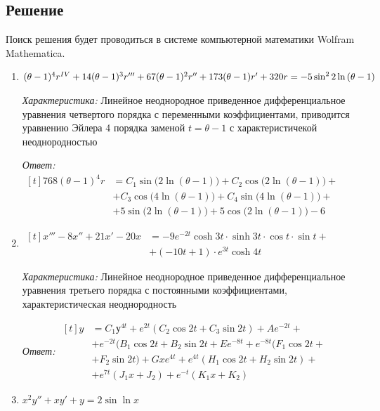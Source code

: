 \documentclass[a4paper, 14pt, fleqn]{extarticle}
\begin{document}
		\subsection{Решение}
			\noindent Поиск решения будет проводиться в системе компьютерной математики Wolfram Mathematica.
			\begin{enumerate}
				\item  \((\theta - 1)^4r^{\MakeUppercase{\romannumeral 4}} + 14(\theta - 1)^3r''' + 67(\theta - 1)^2r'' + 173(\theta - 1)r' + 320r = -5\sin^2{2\ln{(\theta - 1)}} \)

					\textit{Характеристика:} Линейное неоднородное приведенное дифференциальное уравнения четвертого порядка с переменными коэффициентами, приводится
										уравнению Эйлера 4 порядка заменой \( t = \theta -1 \) с характеристичекой неоднородностью
		
					\textit{Ответ:} \( \begin{aligned}[t] 768(\theta - 1)^4r &= C_1\sin\big(2\ln{(\theta - 1)}\big) + C_2\cos\big(2\ln{(\theta - 1)}\big) + \\&+ C_3\cos\big(4\ln{(\theta - 1)\big)} + C_4\sin{\big(4\ln{(\theta - 1)\big)}} +\\&+ 5\sin{\big(2\ln{(\theta - 1)}\big)} + 5\cos{\big(2\ln{(\theta - 1)}\big)} - 6   \end{aligned}\)

				\item \( \begin{aligned}[t] x''' - 8x'' + 21x' -20x &= -9e^{-2t}\cosh{3t}\cdot \sinh{3t} \cdot \cos{t} \cdot \sin{t} + \\ &+ (-10t+1)\cdot e^{3t}\cosh{4t} \end{aligned} \)

					\textit{Характеристика:} Линейное неоднородное приведенное дифференциальное уравнения третьего порядка с постоянными коэффициентами, характеристическая неоднородность
		
					\textit{Ответ:} \(\begin{aligned}[t] y &= C_1у^{4t}+e^{2t}(C_2\cos{2t} + C_3\sin{2t}) + Ae^{-2t} +\\ &+ e^{-2t}(B_1\cos{2t} + B_2\sin{2t} + Ee^{-8t} + e^{-8t}(F_1\cos{2t} +\\&+ F_2\sin{2t}) + Gxe^{4t} + e^{4t}(H_1\cos{2t} +H_2\sin{2t}) +\\&+ e^{7t}(J_1x+J_2) + e^{-t}(K_1x + K_2) \end{aligned}\)
				\pagebreak
				\item \(x^2y'' + xy' + y = 2\sin{\ln{x}} \)


\end{enumerate}
\end{document}
